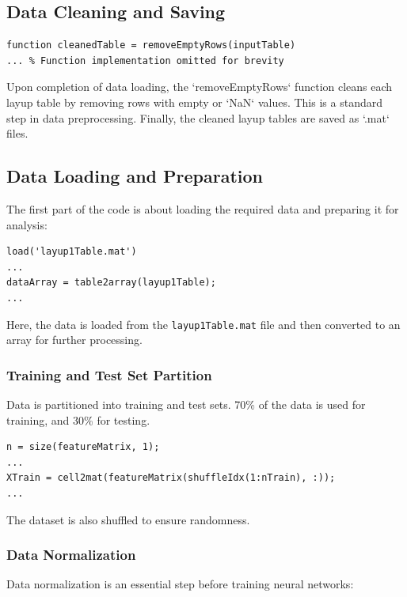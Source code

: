 \subsection{Data Cleaning and Saving}

\begin{lstlisting}
function cleanedTable = removeEmptyRows(inputTable)
... % Function implementation omitted for brevity
\end{lstlisting}

Upon completion of data loading, the `removeEmptyRows` function cleans each layup table by removing rows with empty or `NaN` values. This is a standard step in data preprocessing. Finally, the cleaned layup tables are saved as `.mat` files.

\subsection{Data Loading and Preparation}

The first part of the code is about loading the required data and preparing it for analysis:

\begin{lstlisting}
load('layup1Table.mat')
...
dataArray = table2array(layup1Table);
...
\end{lstlisting}

Here, the data is loaded from the \texttt{layup1Table.mat} file and then converted to an array for further processing\cite{datapreprocess}.

\subsubsection{Training and Test Set Partition}

Data is partitioned into training and test sets. 70\% of the data is used for training, and 30\% for testing. 

\begin{lstlisting}
n = size(featureMatrix, 1);
...
XTrain = cell2mat(featureMatrix(shuffleIdx(1:nTrain), :));
...
\end{lstlisting}

The dataset is also shuffled to ensure randomness\cite{datapreprocess}.

\subsubsection{Data Normalization}

Data normalization is an essential step before training neural networks:

